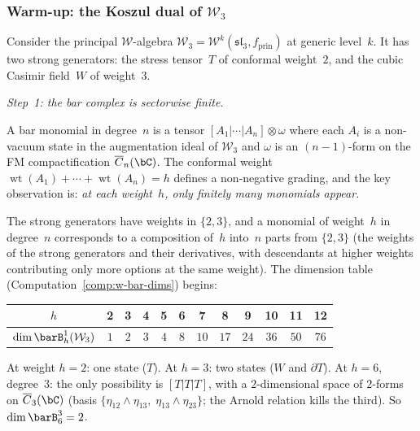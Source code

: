 \subsubsection*{Warm-up: the Koszul dual of $\mathcal{W}_3$}

Consider the principal $\mathcal{W}$-algebra
$\mathcal{W}_3 = \mathcal{W}^k(\mathfrak{sl}_3, f_{\mathrm{prin}})$
at generic level~$k$.
It has two strong generators: the stress tensor~$T$ of conformal
weight~$2$, and the cubic Casimir field~$W$ of weight~$3$.

\emph{Step~1: the bar complex is sectorwise finite.}

A bar monomial in degree~$n$ is a tensor
$[A_1|\cdots|A_n] \otimes \omega$
where each $A_i$ is a non-vacuum state in the augmentation ideal of
$\mathcal{W}_3$ and $\omega$ is an $(n{-}1)$-form on the FM
compactification $\overline{C}_n(\bC)$.  The conformal weight
$\operatorname{wt}(A_1) + \cdots + \operatorname{wt}(A_n) = h$
defines a non-negative grading, and the key observation is:
\emph{at each weight~$h$, only finitely many monomials appear.}

The strong generators have weights in $\{2,3\}$, and a monomial of
weight~$h$ in degree~$n$ corresponds to a composition of~$h$ into~$n$
parts from $\{2,3\}$ (the weights of the strong generators and their
derivatives, with descendants at higher weights contributing only more
options at the same weight).  The dimension table
(Computation~\ref{comp:w-bar-dims}) begins:
\begin{center}
\renewcommand{\arraystretch}{1.1}
\begin{tabular}{c|ccccccccccc}
$h$ & 2 & 3 & 4 & 5 & 6 & 7 & 8 & 9 & 10 & 11 & 12 \\
\hline
$\dim \barB^1_h(\mathcal{W}_3)$ &
$1$ & $2$ & $3$ & $4$ & $8$ & $10$ & $17$ & $24$ & $36$ & $50$ & $76$
\end{tabular}
\end{center}
At weight $h = 2$: one state ($T$).
At $h = 3$: two states ($W$ and $\partial T$).
At $h = 6$, degree~$3$: the only possibility is $[T|T|T]$, with a
$2$-dimensional space of $2$-forms on $\overline{C}_3(\bC)$
(basis $\{\eta_{12} \wedge \eta_{13},\;\eta_{13} \wedge \eta_{23}\}$;
the Arnold relation kills the third).  So $\dim \barB^3_6 = 2$.

